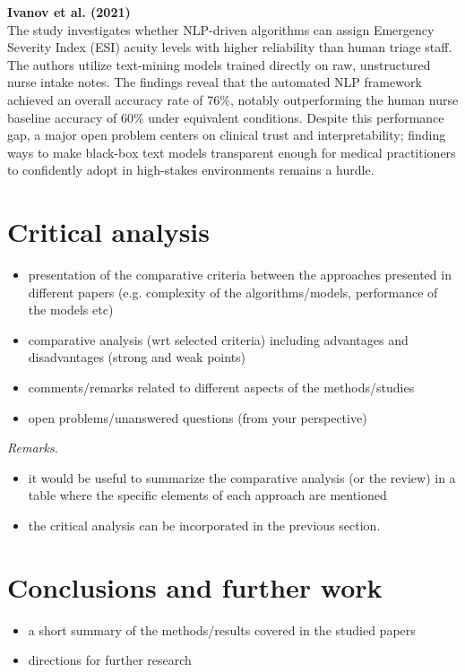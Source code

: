 \documentclass{article}
\begin{document}
\vspace{0.3cm}
\noindent \textbf{Ivanov et al. (2021) \cite{Ivanov2021}} \\
The study investigates whether NLP-driven algorithms can assign Emergency Severity Index (ESI) acuity levels with higher reliability than human triage staff. The authors utilize text-mining models trained directly on raw, unstructured nurse intake notes. The findings reveal that the automated NLP framework achieved an overall accuracy rate of 76\%, notably outperforming the human nurse baseline accuracy of 60\% under equivalent conditions. Despite this performance gap, a major open problem centers on clinical trust and interpretability; finding ways to make black-box text models transparent enough for medical practitioners to confidently adopt in high-stakes environments remains a hurdle.
\section{Critical analysis}
\begin{itemize}
\item presentation of the comparative criteria between the approaches presented in different papers (e.g. complexity of the algorithms/models, performance of the models etc)
\item comparative analysis (wrt selected criteria) including advantages and disadvantages (strong and weak points)
\item comments/remarks related to different aspects of the methods/studies
\item open problems/unanswered questions (from your perspective)

\end{itemize}

{\it Remarks.} 
\begin{itemize}
\item it would be useful to summarize the comparative analysis (or the review) in a table where the specific elements of each approach are mentioned
\item the critical analysis can be incorporated in the previous section.
\end{itemize}


\section{Conclusions and further work}

\begin{itemize}
\item a short summary of the methods/results covered in the studied papers
\item directions for further research
\end{itemize}
\end{document}
